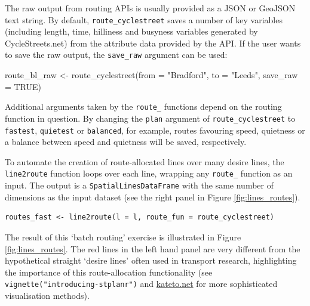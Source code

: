 The raw output from routing APIs is usually provided as a JSON or
GeoJSON text string. By default, \texttt{route\_cyclestreet} saves a
number of key variables (including length, time, hilliness and busyness
variables generated by CycleStreets.net) from the attribute data
provided by the API. If the user wants to save the raw output, the
\texttt{save\_raw} argument can be used:

\begin{Schunk}
\begin{Sinput}
route_bl_raw <- route_cyclestreet(from = "Bradford", to = "Leeds", save_raw = TRUE)
\end{Sinput}
\end{Schunk}

Additional arguments taken by the \texttt{route\_} functions depend on
the routing function in question. By changing the \texttt{plan} argument
of \texttt{route\_cyclestreet} to \texttt{fastest}, \texttt{quietest} or
\texttt{balanced}, for example, routes favouring speed, quietness or a
balance between speed and quietness will be saved, respectively.

To automate the creation of route-allocated lines over many desire
lines, the \texttt{line2route} function loops over each line, wrapping
any \texttt{route\_} function as an input. The output is a
\texttt{SpatialLinesDataFrame} with the same number of dimensions as the
input dataset (see the right panel in Figure \ref{fig:lines_routes}).

\begin{verbatim}
routes_fast <- line2route(l = l, route_fun = route_cyclestreet)
\end{verbatim}

The result of this `batch routing' exercise is illustrated in Figure
\ref{fig:lines_routes}. The red lines in the left hand panel are very
different from the hypothetical straight `desire lines' often used in
transport research, highlighting the importance of this route-allocation
functionality (see \texttt{vignette("introducing-stplanr")} and \href{http://kateto.net/network-visualization}{kateto.net} for more sophisticated visualisation methods).

